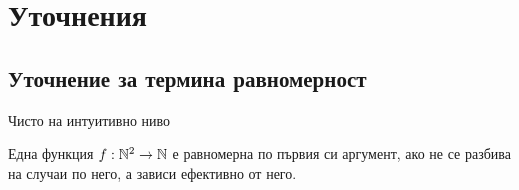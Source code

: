 
\ifnotes
      

      \section{Уточнения}
      \subsection{Уточнение за термина равномерност}
      Чисто на интуитивно ниво

      Една функция $f: {\mathbb{N}}^2 \to {\mathbb{N}}$ е равномерна по първия си аргумент, ако не се разбива на случаи по него, а зависи ефективно от него.
\fi

